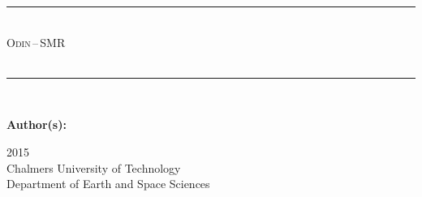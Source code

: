 \begin{titlepage}
\center
\noindent\rule{14cm}{0.4pt} \\[.2in]
{\huge \scshape Odin\,--\,SMR \\[.2in]}
{\Huge\scshape {\bf \CoverTitle}\\[.2in]}
\noindent\rule{14cm}{0.4pt} \\
\begin{flushleft}
{\bf Author(s):} \Authors
\end{flushleft}
2015 \\ Chalmers University of Technology \\ Department of Earth and Space Sciences
\end{titlepage}